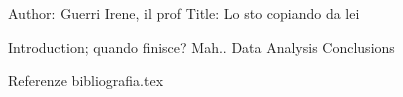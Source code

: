Author: Guerri Irene, il prof 
Title: Lo sto copiando da lei


Introduction; quando finisce? Mah..
Data
Analysis
Conclusions

Referenze
bibliografia.tex

